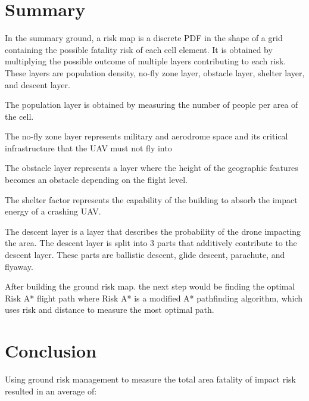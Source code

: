 \documentclass[12pt]{report}
\begin{document}
    \section{Summary}
    In the summary ground, a risk map is a discrete PDF in the shape of a grid containing the possible fatality risk of
    each cell element. It is obtained by multiplying the possible outcome of multiple layers contributing to each risk.
    These layers are population density, no-fly zone layer, obstacle layer, shelter layer, and descent layer.
    \begin{myitemize}
    \item The population layer is obtained by measuring the number of people per area of the cell.
    \item The no-fly zone layer represents military and aerodrome space and its critical infrastructure that the UAV
    must not fly into
    \item The obstacle layer represents a layer where the height of the geographic features becomes an obstacle
    depending on the flight level.
    \item The shelter factor represents the capability of the building to absorb the impact energy of a crashing UAV.
    \item The descent layer is a layer that describes the probability of the drone impacting the area. The descent layer
    is split into 3 parts that additively contribute to the descent layer. These parts are ballistic descent, glide
    descent, parachute, and flyaway.        
    \end{myitemize}

    After building the ground risk map. the next step would be finding the optimal Risk A* flight path where Risk A* is
    a modified A* pathfinding algorithm, which uses risk and distance to measure the most optimal path.

    \section{Conclusion}
    Using ground risk management to measure the total area fatality of impact risk resulted in an average of:
\end{document}
